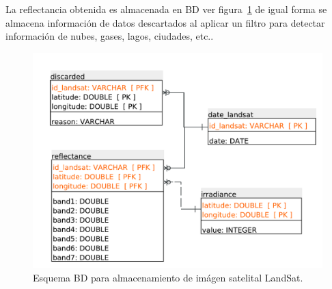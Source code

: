 La reflectancia obtenida es almacenada en BD ver figura~\ref{fig:dblansat} de igual forma se almacena información  de datos descartados al aplicar un filtro 
para detectar información de nubes, gases, lagos, ciudades, etc.\cite{cea2005mejoras}.
\begin{figure}[htb]
  \centering 
  \includegraphics[scale=0.55]{pictures/landsatET.pdf}
  \caption{Esquema BD para almacenamiento de imágen satelital LandSat.} 
  \label{fig:dblansat}
\end{figure}

